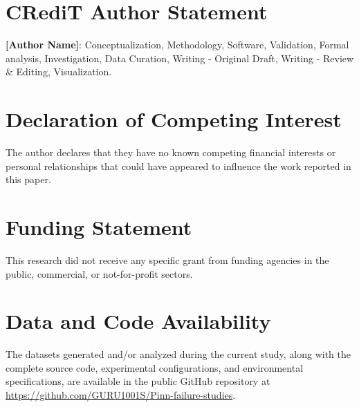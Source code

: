 \section*{CRediT Author Statement}
\textbf{[Author Name]}: Conceptualization, Methodology, Software, Validation, Formal analysis, Investigation, Data Curation, Writing - Original Draft, Writing - Review \& Editing, Visualization.

\section*{Declaration of Competing Interest}
The author declares that they have no known competing financial interests or personal relationships that could have appeared to influence the work reported in this paper.

\section*{Funding Statement}
This research did not receive any specific grant from funding agencies in the public, commercial, or not-for-profit sectors.

\section*{Data and Code Availability}
The datasets generated and/or analyzed during the current study, along with the complete source code, experimental configurations, and environmental specifications, are available in the public GitHub repository at \url{https://github.com/GURU1001S/Pinn-failure-studies}.
